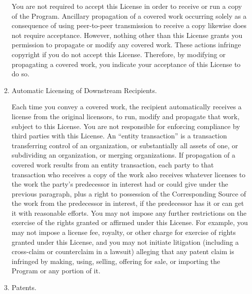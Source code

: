 \documentclass{article}
\begin{document}
\begin{enumerate}[\hspace{-18pt}1.]
You are not required to accept this License in order to receive or run a copy of the Program.  Ancillary propagation of a covered work occurring solely as a consequence of using peer-to-peer transmission to receive a copy likewise does not require acceptance.  However, nothing other than this License grants you permission to propagate or modify any covered work.  These actions infringe copyright if you do not accept this License.  Therefore, by modifying or propagating a covered work, you indicate your acceptance of this License to do so.

\item Automatic Licensing of Downstream Recipients.

Each time you convey a covered work, the recipient automatically receives a license from the original licensors, to run, modify and propagate that work, subject to this License.  You are not responsible for enforcing compliance by third parties with this License.
An ``entity transaction'' is a transaction transferring control of an organization, or substantially all assets of one, or subdividing an organization, or merging organizations.  If propagation of a covered work results from an entity transaction, each party to that transaction who receives a copy of the work also receives whatever licenses to the work the party's predecessor in interest had or could give under the previous paragraph, plus a right to possession of the Corresponding Source of the work from the predecessor in interest, if the predecessor has it or can get it with reasonable efforts.
You may not impose any further restrictions on the exercise of the rights granted or affirmed under this License.  For example, you may not impose a license fee, royalty, or other charge for exercise of rights granted under this License, and you may not initiate litigation (including a cross-claim or counterclaim in a lawsuit) alleging that any patent claim is infringed by making, using, selling, offering for sale, or importing the Program or any portion of it.

\item Patents.


\end{enumerate}
\end{document}
